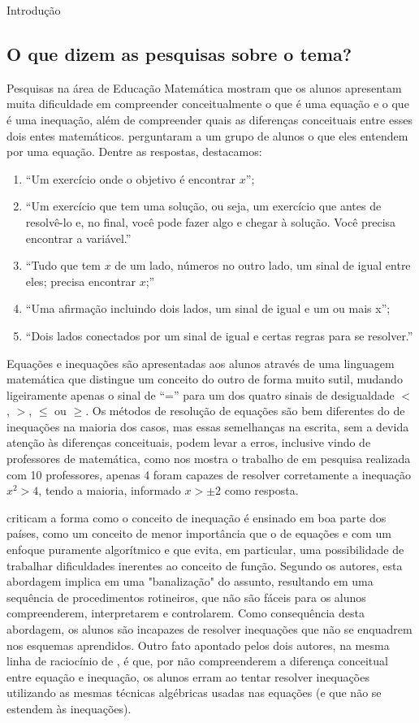 \begin{apresentacao}{Introdução}
\subsection*{O que dizem as pesquisas sobre o tema?}

Pesquisas na área de Educação Matemática mostram que os alunos apresentam muita dificuldade em compreender conceitualmente o que é uma equação e o que é uma inequação, além de compreender quais as diferenças conceituais entre esses dois entes matemáticos. \cite{Dreyfus2004} perguntaram a um grupo de alunos o que eles entendem por uma equação. Dentre as respostas, destacamos:
\begin{enumerate}
\item “Um exercício onde o objetivo é encontrar $x$”;
\item “Um exercício que tem uma solução, ou seja, um exercício que antes de resolvê-lo e, no final, você pode fazer algo e chegar à solução. Você precisa encontrar a variável.”
\item “Tudo que tem $x$ de um lado, números no outro lado, um sinal de igual entre eles; precisa encontrar $x$;”
\item “Uma afirmação incluindo dois lados, um sinal de igual e um ou mais x”; 
\item  “Dois lados conectados por um sinal de igual e certas regras para se resolver.”{} 
\end{enumerate}


Equações e inequações são apresentadas aos alunos através de uma linguagem matemática que distingue um conceito do outro de forma muito sutil, mudando ligeiramente apenas o sinal de “=”{} para um dos quatro sinais de desigualdade  $<$, $>$, $\leq$ ou $\geq$. Os métodos de resolução de equações são bem diferentes do de inequações na maioria dos casos, mas essas semelhanças na escrita, sem a devida atenção às diferenças conceituais, podem levar a erros, inclusive vindo de professores de matemática, como nos mostra o trabalho de \cite{Lourenco2018} em pesquisa realizada com 10 professores, apenas 4 foram capazes de resolver corretamente a inequação $x^2 >4$, tendo a maioria, informado $x>\pm 2$ como resposta. 

\cite{Boero2004} criticam a forma como o conceito de inequação é ensinado em boa parte dos países, como um conceito de menor importância que o de equações e com um enfoque puramente algorítmico e que evita, em particular, uma possibilidade de trabalhar dificuldades inerentes ao conceito de função. Segundo os autores, esta abordagem implica em uma "banalização"{} do assunto, resultando em uma sequência de procedimentos rotineiros, que não são fáceis para os alunos compreenderem, interpretarem e controlarem. Como consequência desta abordagem, os alunos são incapazes de resolver inequações que não se enquadrem nos esquemas aprendidos. Outro fato apontado pelos dois autores, na mesma linha de raciocínio de \cite{Lourenco2018}, é que, por não compreenderem a diferença conceitual entre equação e inequação, os alunos erram ao tentar resolver inequações utilizando as mesmas técnicas algébricas usadas nas equações (e que não se estendem às inequações).


\end{apresentacao}
